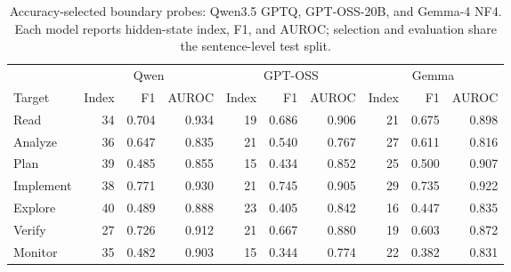 \begin{table}[ht]
\centering\small
\caption{Accuracy-selected boundary probes: Qwen3.5 GPTQ, GPT-OSS-20B, and Gemma-4 NF4. Each model reports hidden-state index, F1, and AUROC; selection and evaluation share the sentence-level test split.}
\label{tab:probe-models}
\begin{tabular}{lrrrrrrrrr}
\toprule
 & \multicolumn{3}{c}{Qwen} & \multicolumn{3}{c}{GPT-OSS} & \multicolumn{3}{c}{Gemma} \\
Target & Index & F1 & AUROC & Index & F1 & AUROC & Index & F1 & AUROC \\
\midrule
Read & 34 & 0.704 & 0.934 & 19 & 0.686 & 0.906 & 21 & 0.675 & 0.898 \\
Analyze & 36 & 0.647 & 0.835 & 21 & 0.540 & 0.767 & 27 & 0.611 & 0.816 \\
Plan & 39 & 0.485 & 0.855 & 15 & 0.434 & 0.852 & 25 & 0.500 & 0.907 \\
Implement & 38 & 0.771 & 0.930 & 21 & 0.745 & 0.905 & 29 & 0.735 & 0.922 \\
Explore & 40 & 0.489 & 0.888 & 23 & 0.405 & 0.842 & 16 & 0.447 & 0.835 \\
Verify & 27 & 0.726 & 0.912 & 21 & 0.667 & 0.880 & 19 & 0.603 & 0.872 \\
Monitor & 35 & 0.482 & 0.903 & 15 & 0.344 & 0.774 & 22 & 0.382 & 0.831 \\
\bottomrule
\end{tabular}
\end{table}
